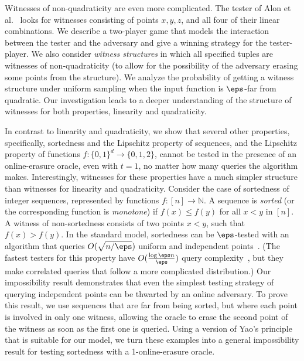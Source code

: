 \documentclass[11pt]{article}
\numberwithin{equation}{section}
\theoremstyle{definition}
\theoremstyle{plain}
\begin{document}
Witnesses of non-quadraticity are even more complicated. 
The tester of Alon et al.~\cite{AlonKKLR05} looks for witnesses consisting of points $x,y,z$, and all four of their linear combinations.
We describe a two-player game that models the interaction between the tester and the adversary and give a winning strategy for the tester-player. We also consider {\em witness structures} in which all specified tuples are witnesses of non-quadraticity (to allow for the possibility of the adversary erasing some points from the structure). We analyze the probability of getting a witness structure under uniform sampling when the input function is $\eps$-far from quadratic.
Our investigation leads to a deeper understanding of the structure of witnesses for both properties, linearity and quadraticity.

In contrast to linearity and quadraticity, we show that several other properties, specifically, sortedness and the Lipschitz property of sequences, and the Lipschitz property of functions $f:\{0,1\}^d\to\{0,1,2\}$, cannot be tested in the presence of an online-erasure oracle, even with $t=1$, no matter how many queries the algorithm makes. Interestingly, witnesses for these properties have a much simpler structure than witnesses for linearity and quadraticity. Consider the case of sortedness  of integer sequences, represented by functions $f:[n]\to\mathbb{N}.$ A sequence is {\em sorted} (or the corresponding function is {\em monotone}) if $f(x) \leq f(y)$ for all $x< y $ in $[n]$.
A witness of non-sortedness consists of two points $x<y$, such that $f(x)>f(y).$
In the standard model, sortedness can be $\eps$-tested with an algorithm that queries $O(\sqrt{n/\eps})$ uniform and independent points~\cite{FLNRRS02}. (The fastest testers for this property have $O(\frac{\log \eps n}\eps)$ query complexity~\cite{EKKRV00,DGLRRS99,BGJRW12,CS13,Belovs18}, but 
they make correlated queries that follow a more complicated distribution.) Our impossibility result demonstrates that even the simplest 
testing strategy of querying independent points
can be thwarted by an online adversary. 
To prove this result, we use sequences that are far from being sorted, but where each point is involved in only one witness, allowing the oracle to erase the second point of the witness as soon as the first one is queried. Using a version of Yao's principle that is suitable for our model, we turn these examples into a general impossibility result for testing sortedness with a 1-online-erasure oracle.
\end{document}
